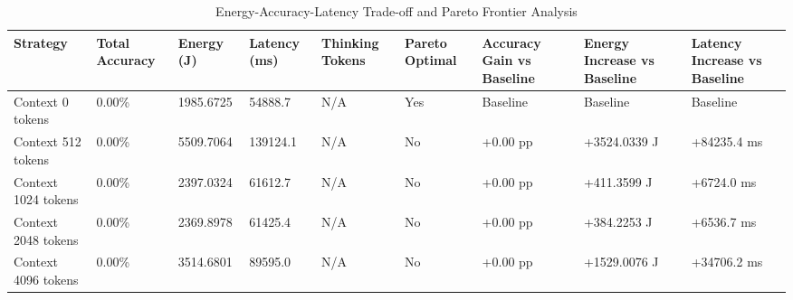 \begin{table}
\caption{Energy-Accuracy-Latency Trade-off and Pareto Frontier Analysis}
\label{tab:tradeoff_comparison}
\begin{tabular}{lllllllll}
\toprule
Strategy & Total Accuracy & Energy (J) & Latency (ms) & Thinking Tokens & Pareto Optimal & Accuracy Gain vs Baseline & Energy Increase vs Baseline & Latency Increase vs Baseline \\
\midrule
Context 0 tokens & 0.00\% & 1985.6725 & 54888.7 & N/A & Yes & Baseline & Baseline & Baseline \\
Context 512 tokens & 0.00\% & 5509.7064 & 139124.1 & N/A & No & +0.00 pp & +3524.0339 J & +84235.4 ms \\
Context 1024 tokens & 0.00\% & 2397.0324 & 61612.7 & N/A & No & +0.00 pp & +411.3599 J & +6724.0 ms \\
Context 2048 tokens & 0.00\% & 2369.8978 & 61425.4 & N/A & No & +0.00 pp & +384.2253 J & +6536.7 ms \\
Context 4096 tokens & 0.00\% & 3514.6801 & 89595.0 & N/A & No & +0.00 pp & +1529.0076 J & +34706.2 ms \\
\bottomrule
\end{tabular}
\end{table}
